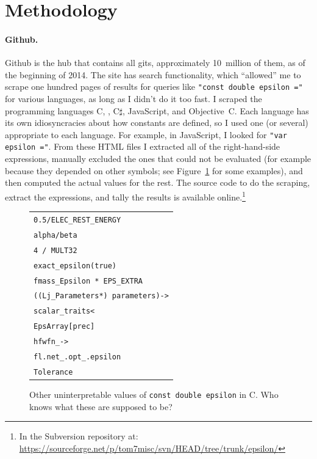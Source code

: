 \documentclass[twocolumn]{article}
\begin{document}
\section{Methodology}

\paragraph{Github.} Github is the hub that contains all gits, approximately
10~million of them, as of the beginning of 2014. The site has search
functionality, which ``allowed'' me to scrape one hundred pages of
results for queries like {\tt "const double epsilon ="} for various
languages, as long as I didn't do it too fast. I scraped the
programming languages C, \CC, C$\sharp$, JavaScript, and Objective~C.
Each language has its own idiosyncracies about how constants are
defined, so I used one (or several) appropriate to each language. For
example, in JavaScript, I looked for {\tt "var epsilon ="}. From these
HTML files I extracted all of the right-hand-side expressions,
manually excluded the ones that could not be evaluated (for example
because they depended on other symbols; see
Figure~\ref{fig:cdoubleuninterpretable} for some examples), and then
computed the actual values for the rest. The source code to do the
scraping, extract the expressions, and tally the results is available
online.\!\footnote{In the Subversion repository at:
  \url{https://sourceforge.net/p/tom7misc/svn/HEAD/tree/trunk/epsilon/}}

\begin{figure}[ht]
\begin{center}
\begin{tabular}{l}
\verb+0.5/ELEC_REST_ENERGY+ \\
\verb+alpha/beta+ \\
\verb+4 / MULT32+ \\
\verb+exact_epsilon(true)+ \\
\verb+fmass_Epsilon * EPS_EXTRA+ \\
\verb+((Lj_Parameters*) parameters)->+ \\
\verb+scalar_traits<+ \\
\verb+EpsArray[prec]+ \\
\verb+hfwfn_->+ \\
\verb+fl.net_.opt_.epsilon+ \\
\verb+Tolerance+ \\
\end{tabular}
\end{center}\vspace{-0.1in}
\caption{ Other uninterpretable values of {\tt const double epsilon}
  in C. Who knows what these are supposed to be?}
\label{fig:cdoubleuninterpretable}
\end{figure}
\end{document}

